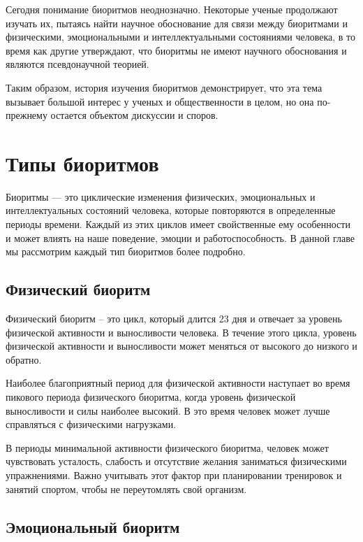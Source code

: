 Сегодня понимание биоритмов неоднозначно. Некоторые ученые продолжают изучать их, пытаясь найти научное обоснование для связи между биоритмами и физическими, эмоциональными и интеллектуальными состояниями человека, в то время как другие утверждают, что биоритмы не имеют научного обоснования и являются псевдонаучной теорией.

Таким образом, история изучения биоритмов демонстрирует, что эта тема вызывает большой интерес у ученых и общественности в целом, но она по-прежнему остается объектом дискуссии и споров.

\newpage

\section{Типы биоритмов}

Биоритмы --- это циклические изменения физических, эмоциональных и интеллектуальных состояний человека, которые повторяются в определенные периоды времени. Каждый из этих циклов имеет свойственные ему особенности и может влиять на наше поведение, эмоции и работоспособность. В данной главе мы рассмотрим каждый тип биоритмов более подробно.

\subsection{Физический биоритм}

Физический биоритм – это цикл, который длится 23 дня и отвечает за уровень физической активности и выносливости человека. В течение этого цикла, уровень физической активности и выносливости может меняться от высокого до низкого и обратно.

Наиболее благоприятный период для физической активности наступает во время пикового периода физического биоритма, когда уровень физической выносливости и силы наиболее высокий. В это время человек может лучше справляться с физическими нагрузками.

В периоды минимальной активности физического биоритма, человек может чувствовать усталость, слабость и отсутствие желания заниматься физическими упражнениями. Важно учитывать этот фактор при планировании тренировок и занятий спортом, чтобы не переутомлять свой организм.

\subsection{Эмоциональный биоритм}

